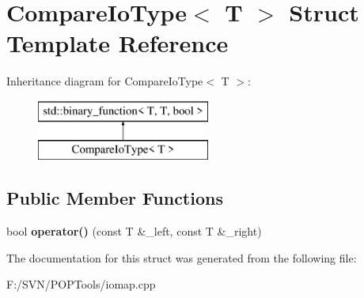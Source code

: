\hypertarget{struct_compare_io_type}{\section{Compare\-Io\-Type$<$ T $>$ Struct Template Reference}
\label{struct_compare_io_type}
}
Inheritance diagram for Compare\-Io\-Type$<$ T $>$\-:\begin{figure}[H]
\begin{center}
\leavevmode
\includegraphics[height=2.000000cm]{struct_compare_io_type}
\end{center}
\end{figure}
\subsection*{Public Member Functions}
\begin{DoxyCompactItemize}
\item 
\hypertarget{struct_compare_io_type_a95f85774ed4337a060146495764d185c}{bool {\bfseries operator()} (const T \&\-\_\-left, const T \&\-\_\-right)}\label{struct_compare_io_type_a95f85774ed4337a060146495764d185c}

\end{DoxyCompactItemize}


The documentation for this struct was generated from the following file\-:\begin{DoxyCompactItemize}
\item 
F\-:/\-S\-V\-N/\-P\-O\-P\-Tools/iomap.\-cpp\end{DoxyCompactItemize}
